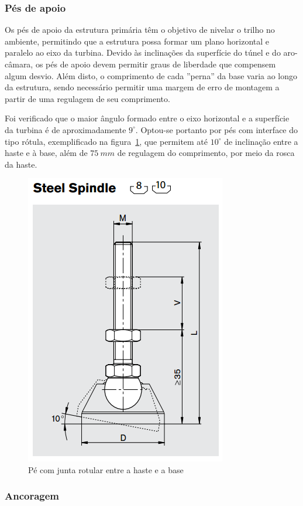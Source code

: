 \subsubsection{Pés de apoio}

Os pés de apoio da estrutura primária têm o objetivo de nivelar o trilho no
ambiente, permitindo que a estrutura possa formar um plano horizontal e paralelo
ao eixo da turbina. Devido às inclinações da superfície do túnel e do
aro-câmara, os pés de apoio devem permitir graus de liberdade que compensem
algum desvio. Além disto, o comprimento de cada ''perna'' da base varia ao
longo da estrutura, sendo necessário permitir uma margem de erro de
montagem a partir de uma regulagem de seu comprimento.

Foi verificado que o maior ângulo formado entre o eixo horizontal e a superfície
da turbina é de aproximadamente $9^{\circ}$. Optou-se portanto por pés com
interface do tipo rótula, exemplificado na figura~\ref{fig::spindle}, que
permitem até $10^{\circ}$ de inclinação entre a haste e à base, além de $75~mm$ de regulagem
do comprimento, por meio da rosca da haste. %

\begin{figure}[h!]
	\centering
	\includegraphics[width=0.4\columnwidth]{method/figs/construcao/spindle}
	\caption{Pé com junta rotular entre a haste e a base}
    \label{fig::spindle}
\end{figure}

\subsubsection{Ancoragem}

